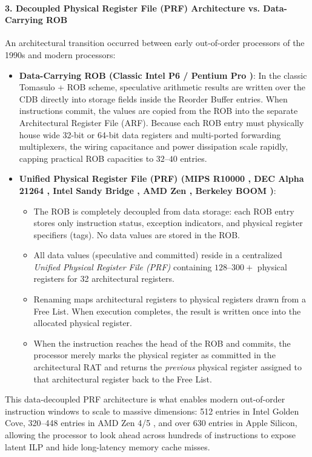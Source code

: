 \paragraph{3. Decoupled Physical Register File (PRF) Architecture vs. Data-Carrying ROB}
An architectural transition occurred between early out-of-order processors of the 1990s and modern processors:
\begin{itemize}
    \item \textbf{Data-Carrying ROB (Classic Intel P6 / Pentium Pro \cite{papworth1996tuning})}: In the classic Tomasulo + ROB scheme, speculative arithmetic results are written over the CDB directly into storage fields inside the Reorder Buffer entries. When instructions commit, the values are copied from the ROB into the separate Architectural Register File (ARF). Because each ROB entry must physically house wide 32-bit or 64-bit data registers and multi-ported forwarding multiplexers, the wiring capacitance and power dissipation scale rapidly, capping practical ROB capacities to $32\text{--}40$ entries.
    \item \textbf{Unified Physical Register File (PRF) (MIPS R10000 \cite{yeager1996mips}, DEC Alpha 21264 \cite{kessler1999alpha}, Intel Sandy Bridge \cite{rotem2012power}, AMD Zen \cite{singh2017zen, suggs2020zen2}, Berkeley BOOM \cite{celio2018boom})}:
    \begin{itemize}
        \item The ROB is completely decoupled from data storage: each ROB entry stores only instruction status, exception indicators, and physical register specifiers (tags). No data values are stored in the ROB.
        
        \item All data values (speculative and committed) reside in a centralized \textit{Unified Physical Register File (PRF)} containing $128\text{--}300+$ physical registers for 32 architectural registers.
        
        \item Renaming maps architectural registers to physical registers drawn from a Free List. When execution completes, the result is written once into the allocated physical register.
        
        \item When the instruction reaches the head of the ROB and commits, the processor merely marks the physical register as committed in the architectural RAT and returns the \emph{previous} physical register assigned to that architectural register back to the Free List.
    \end{itemize}
\end{itemize}
This data-decoupled PRF architecture is what enables modern out-of-order instruction windows to scale to massive dimensions: 512 entries in Intel Golden Cove, 320--448 entries in AMD Zen 4/5 \cite{suggs2020zen2}, and over 630 entries in Apple Silicon, allowing the processor to look ahead across hundreds of instructions to expose latent ILP and hide long-latency memory cache misses.

